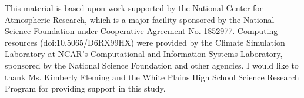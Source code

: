 \documentclass[draft]{agujournal2019}
\begin{document}
%
%
%
%
%
%
%
%


\acknowledgments




%
%


This material is based upon work supported by the National Center for Atmospheric Research, which is a major facility sponsored by the National Science Foundation under Cooperative Agreement No. 1852977. Computing resources (doi:10.5065/D6RX99HX) were provided by the Climate Simulation Laboratory at NCAR's Computational and Information Systems Laboratory, sponsored by the National Science Foundation and other agencies. I would like to thank Ms. Kimberly Fleming and the White Plains High School Science Research Program for providing support in this study.


%
%
%
%
%
\end{document}
